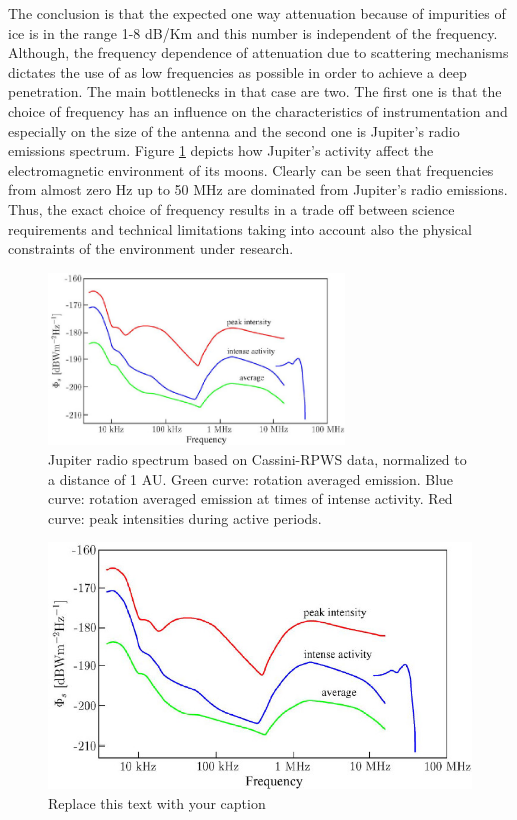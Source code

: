 The conclusion is that the expected one way attenuation because of impurities of ice is in the range 1-8 dB/Km and this number is independent of the frequency. Although, the frequency dependence of attenuation due to scattering mechanisms dictates the use of as low frequencies as possible in order to achieve a deep penetration. The main bottlenecks in that case are two. The first one is that the choice of frequency has an influence on the characteristics of instrumentation and especially on the size of the antenna and the second one is Jupiter's radio emissions spectrum. Figure \ref{fig:J_spec} depicts how Jupiter's activity affect the electromagnetic environment of its moons. Clearly can be seen that frequencies from almost zero Hz up to 50 MHz are dominated from Jupiter's radio emissions. Thus, the exact choice of frequency results in a trade off between science requirements and technical limitations taking into account also the physical constraints of the environment under research. 

\begin{figure}[htb]
\centering
\includegraphics[width=0.7\textwidth]{figures/below100.jpg}
\caption{Jupiter radio spectrum based on Cassini-RPWS data,
normalized to a distance of 1 AU. Green curve: rotation averaged
emission. Blue curve: rotation averaged emission at times of intense
activity. Red curve: peak intensities during active periods. \cite{Grie_meier_2005}}
\label{fig:J_spec}
\end{figure}


\begin{figure}[htb]
\begin{center}
\includegraphics[width=0.7\columnwidth]{figures/below100}
\caption{Replace this text with your caption%
}
\end{center}
\end{figure}

